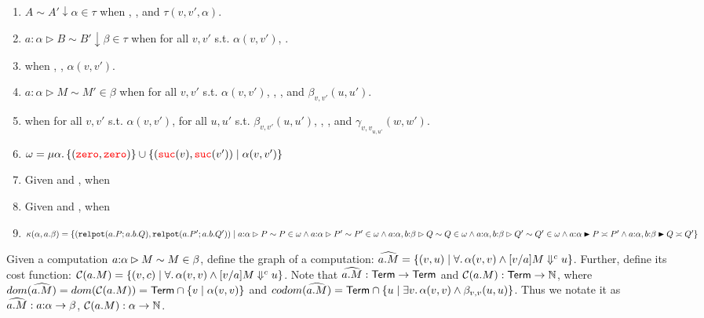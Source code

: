 \begin{enumerate}
  \item $A \sim A' \downarrow \alpha \in \tau$ when , , and 
  $\tau(v,v',\alpha)$.
  \item $a : \alpha \rhd B \sim B' \downarrow \beta \in \tau$ when 
  for all $v,v'$ s.t. $\alpha(v,v')$, .
\item {} when , , $\alpha(v,v')$.
  \item $a : \alpha \rhd M \sim M' \in \beta$ when 
  for all $v,v'$ s.t. $\alpha(v,v')$, 
  , , and $\beta_{v,v'}(u,u')$.
\item {} when 
  for all $v,v'$ s.t. $\alpha(v,v')$, 
  for all $u,u'$ s.t. $\beta_{v,v'}(u,u')$, 
  , , and $\gamma_{{v,v}_{u,u'}}(w,w')$.
  \item $\omega = \mu \alpha.\, \{({\color{red}{\mathtt{zero}}},{\color{red}{\mathtt{zero}}})\} \cup \{({\color{red}{\mathtt{suc}}}(v),{\color{red}{\mathtt{suc}}}(v')) \mid \alpha(v,v')\}$
  \item Given  and
      , 
     when 
  \item Given 
      and , 
       when 
  \item $\kappa(\alpha, a.\beta) =
    \{(\relpot{a}{P}{a.b}{Q}, \relpot{a}{P'}{a.b}{Q'}) \mid \\
      \sameComp{\isOf{a}{\alpha}}{P}{P}{\omega}\\
      \land\sameComp{\isOf{a}{\alpha}}{P'}{P'}{\omega}\\
      \land\sameComp{\isOf{a}{\alpha}, \isOf{b}{\beta}}{Q}{Q}{\omega}\\
      \land\sameComp{\isOf{a}{\alpha}, \isOf{b}{\beta}}{Q'}{Q'}{\omega}\\
      \land\equivComp{\isOf{a}{\alpha}}{P}{P'}\\
      \land\equivComp{\isOf{a}{\alpha},\isOf{b}{\beta}}{Q}{Q'}\\
    \}$
\end{enumerate}

Given a computation $a {:} \alpha \rhd M \sim M \in \beta$, 
define the graph of a computation: $\widehat{a.M} = \{(v,u) \mid \forall.\, \alpha(v,v) \land [v/a]M \Downarrow^{c} u\}$.
Further, define its cost function: $\mathcal{C}(a.M) = \{(v,c) \mid \forall.\, \alpha(v,v) \land [v/a]M \Downarrow^{c} u\}$.
Note that $\widehat{a.M} : \mathsf{Term} \to \mathsf{Term}$ and $\mathcal{C}(a.M) : \mathsf{Term} \to \mathbb{N}$, 
where $dom(\widehat{a.M}) = dom(\mathcal{C}(a.M)) = \mathsf{Term} \cap \{v \mid \alpha(v,v)\}$ and $codom(\widehat{a.M}) = \mathsf{Term} \cap \{u \mid \exists v.\, \alpha(v,v) \land \beta_{v,v}(u,u)\}$.
Thus we notate it as $\widehat{a.M} : a {:} \alpha \to \beta$, $\mathcal{C}(a.M) : \alpha \to \mathbb{N}$.

